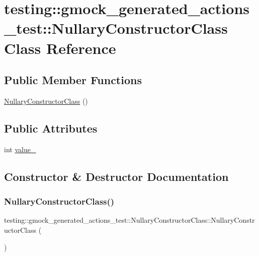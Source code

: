 \hypertarget{classtesting_1_1gmock__generated__actions__test_1_1NullaryConstructorClass}{}\section{testing\+::gmock\+\_\+generated\+\_\+actions\+\_\+test\+::Nullary\+Constructor\+Class Class Reference}
\label{classtesting_1_1gmock__generated__actions__test_1_1NullaryConstructorClass}
\subsection*{Public Member Functions}
\begin{DoxyCompactItemize}
\item 
\mbox{\hyperlink{classtesting_1_1gmock__generated__actions__test_1_1NullaryConstructorClass_a8ad709e8d6c391958907dafea12d38a2}{Nullary\+Constructor\+Class}} ()
\end{DoxyCompactItemize}
\subsection*{Public Attributes}
\begin{DoxyCompactItemize}
\item 
int \mbox{\hyperlink{classtesting_1_1gmock__generated__actions__test_1_1NullaryConstructorClass_aa877ccc5aff335cbf81b8de90abee732}{value\+\_\+}}
\end{DoxyCompactItemize}


\subsection{Constructor \& Destructor Documentation}
\mbox{\label{classtesting_1_1gmock__generated__actions__test_1_1NullaryConstructorClass_a8ad709e8d6c391958907dafea12d38a2}} 
\subsubsection{\texorpdfstring{NullaryConstructorClass()}{NullaryConstructorClass()}}
{\footnotesize\ttfamily testing\+::gmock\+\_\+generated\+\_\+actions\+\_\+test\+::\+Nullary\+Constructor\+Class\+::\+Nullary\+Constructor\+Class (\begin{DoxyParamCaption}{ }\end{DoxyParamCaption})\hspace{0.3cm}{\ttfamily [inline]}}



